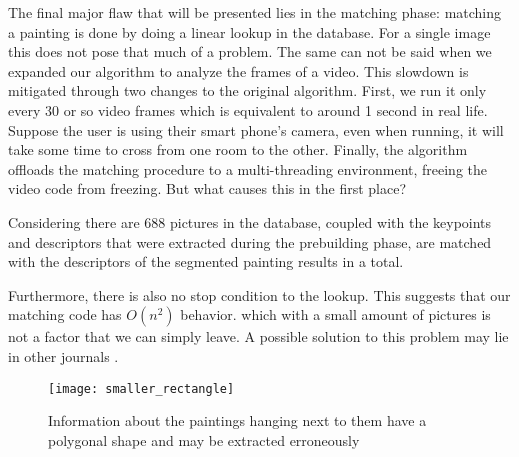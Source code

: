 The final major flaw that will be presented lies in the matching phase: matching a painting is done by doing a linear lookup in the database. For a single image this does not pose that much of a problem. The same can not be said when we expanded our algorithm to analyze the frames of a video. This slowdown is mitigated through two changes to the original algorithm. First, we run it only every 30 or so video frames which is equivalent to around 1 second in real life. Suppose the user is using their smart phone's camera, even when running, it will take some time to cross from one room to the other. Finally, the algorithm offloads the matching procedure to a multi-threading environment, freeing the video code from freezing. But what causes this in the first place? 


Considering there are 688 pictures in the database, coupled with the keypoints and descriptors that were extracted during the prebuilding phase, are matched with the descriptors of the segmented painting results in a total.

Furthermore, there is also no stop condition to the lookup.
This suggests that our matching code has $O(n^{2})$ behavior.
which with a small amount of pictures is not a factor that we can simply leave. A possible solution to this problem may lie in other journals . 


\begin{figure}
	\texttt{[image: smaller\_rectangle]}
	\caption{Information about the paintings hanging next to them have a polygonal shape and may be extracted erroneously}
	\label{fig:smaller_rectangle}
\end{figure}